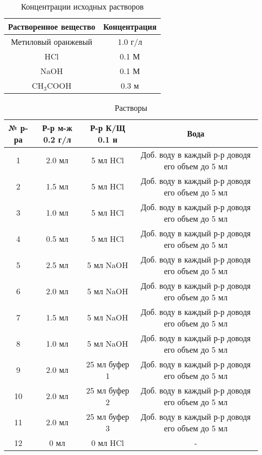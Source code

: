 \documentclass[a4paper,12pt]{article} %
\begin{document}
\paragraph{}
\begin{table}[H]
    \begin{center}
        \begin{tabular}{|c|c|}
        \hline
           Растворенное вещество & Концентрация\\\hline
           Метиловый оранжевый   & 1.0 г/л\\\hline
           HCl & 0.1 М \\\hline
           NaOH & 0.1 М\\\hline
           CH${_3}$COOH & 0.3 м \\\hline
        \end{tabular}
        \caption{Концентрации исходных растворов}
    \end{center}
\end{table}
\begin{table}[H]
    \begin{center}
        \begin{tabular}{|c|c|c|c|}
        \hline
            № р-ра & Р-р м-ж 0.2 г/л & Р-р К/Щ 0.1 н & Вода\\\hline
            1 & 2.0 мл & 5 мл HCl & Доб. воду в каждый р-р доводя его объем до 5 мл\\\hline
            2 & 1.5 мл & 5 мл HCl & Доб. воду в каждый р-р доводя его объем до 5 мл\\\hline
            3 & 1.0 мл & 5 мл HCl & Доб. воду в каждый р-р доводя его объем до 5 мл\\\hline
            4 & 0.5 мл & 5 мл HCl & Доб. воду в каждый р-р доводя его объем до 5 мл\\\hline
            5 & 2.5 мл & 5 мл NaOH & Доб. воду в каждый р-р доводя его объем до 5 мл\\\hline
            6 & 2.0 мл & 5 мл NaOH & Доб. воду в каждый р-р доводя его объем до 5 мл\\\hline
            7 & 1.5 мл & 5 мл NaOH & Доб. воду в каждый р-р доводя его объем до 5 мл\\\hline
            8 & 1.0 мл & 5 мл NaOH & Доб. воду в каждый р-р доводя его объем до 5 мл\\\hline
            9 & 2.0 мл & 25 мл буфер 1 & Доб. воду в каждый р-р доводя его объем до 5 мл\\\hline
            10 & 2.0 мл & 25 мл буфер 2 & Доб. воду в каждый р-р доводя его объем до 5 мл\\\hline
            11 & 2.0 мл & 25 мл буфер 3 & Доб. воду в каждый р-р доводя его объем до 5 мл\\\hline
            12 & 0 мл & 0 мл HCl & -\\\hline
        \end{tabular}
        \caption{Растворы}
    \end{center}
\end{table}
\end{document}
